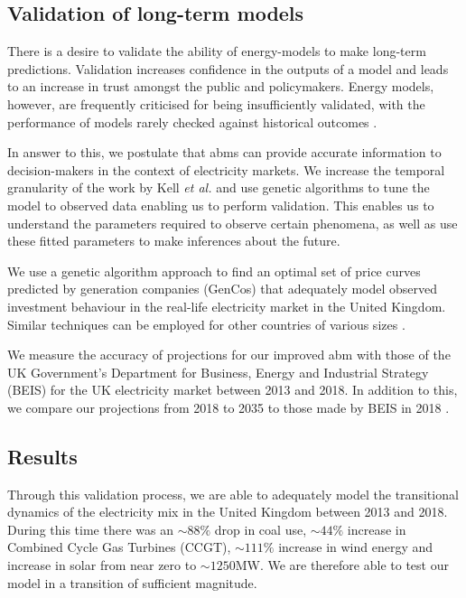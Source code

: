 \subsection{Validation of long-term models}

There is a desire to validate the ability of energy-models to make long-term predictions. Validation increases confidence in the outputs of a model and leads to an increase in trust amongst the public and policymakers. Energy models, however, are frequently criticised for being insufficiently validated, with the performance of models rarely checked against historical outcomes \cite{Beckman2011}.

In answer to this, we postulate that \acrshort{abm}s can provide accurate information to decision-makers in the context of electricity markets. We increase the temporal granularity of the work by Kell \textit{et al.} \cite{Kell} and use genetic algorithms to tune the model to observed data enabling us to perform validation. This enables us to understand the parameters required to observe certain phenomena, as well as use these fitted parameters to make inferences about the future. 




We use a genetic algorithm approach to find an optimal set of price curves predicted by generation companies (GenCos) that adequately model observed investment behaviour in the real-life electricity market in the United Kingdom. Similar techniques can be employed for other countries of various sizes \cite{Kell}. 

We measure the accuracy of projections for our improved \acrshort{abm} with those of the UK Government's Department for Business, Energy and Industrial Strategy (BEIS) for the UK electricity market between 2013 and 2018. In addition to this, we compare our projections from 2018 to 2035 to those made by BEIS in 2018 \cite{DBEIS2019}.




\subsection{Results}
\label{elecsim:sec:results}

Through this validation process, we are able to adequately model the transitional dynamics of the electricity mix in the United Kingdom between 2013 and 2018. During this time there was an ${\sim}88\%$ drop in coal use, ${\sim}44\%$ increase in Combined Cycle Gas Turbines (CCGT), ${\sim}111\% $ increase in wind energy and increase in solar from near zero to ${\sim}1250$MW. We are therefore able to test our model in a transition of sufficient magnitude.

